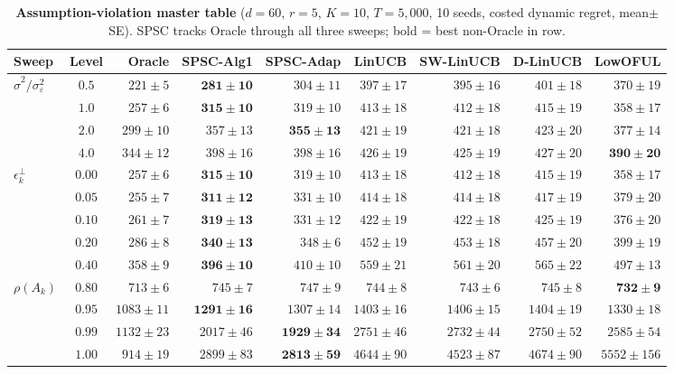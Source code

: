 \documentclass{article}
\begin{document}
\begin{table}[!htbp]
\centering
\caption{\textbf{Assumption-violation master table} ($d{=}60$,
$r{=}5$, $K{=}10$, $T{=}5{,}000$, 10 seeds, costed dynamic regret,
mean$\pm$SE). SPSC tracks Oracle through all three sweeps; bold =
best non-Oracle in row.}
\label{tab:assumption_master}
\footnotesize
\setlength{\tabcolsep}{4pt}
\begin{tabular}{lcrrrrrrr}
\toprule
Sweep & Level & Oracle & SPSC-Alg1 & SPSC-Adap & LinUCB & SW-LinUCB & D-LinUCB & LowOFUL \\
\midrule
\multirow{4}{*}{$\hat\sigma^2/\sigma_\varepsilon^2$}
 & $0.5$ & $221\pm5$  & $\mathbf{281\pm10}$ & $304\pm11$ & $397\pm17$ & $395\pm16$ & $401\pm18$ & $370\pm19$ \\
 & $1.0$ & $257\pm6$  & $\mathbf{315\pm10}$ & $319\pm10$ & $413\pm18$ & $412\pm18$ & $415\pm19$ & $358\pm17$ \\
 & $2.0$ & $299\pm10$ & $357\pm13$ & $\mathbf{355\pm13}$ & $421\pm19$ & $421\pm18$ & $423\pm20$ & $377\pm14$ \\
 & $4.0$ & $344\pm12$ & $398\pm16$ & $398\pm16$ & $426\pm19$ & $425\pm19$ & $427\pm20$ & $\mathbf{390\pm20}$ \\
\midrule
\multirow{5}{*}{$\epsilon_k^\perp$}
 & $0.00$ & $257\pm6$ & $\mathbf{315\pm10}$ & $319\pm10$ & $413\pm18$ & $412\pm18$ & $415\pm19$ & $358\pm17$ \\
 & $0.05$ & $255\pm7$ & $\mathbf{311\pm12}$ & $331\pm10$ & $414\pm18$ & $414\pm18$ & $417\pm19$ & $379\pm20$ \\
 & $0.10$ & $261\pm7$ & $\mathbf{319\pm13}$ & $331\pm12$ & $422\pm19$ & $422\pm18$ & $425\pm19$ & $376\pm20$ \\
 & $0.20$ & $286\pm8$ & $\mathbf{340\pm13}$ & $348\pm6$  & $452\pm19$ & $453\pm18$ & $457\pm20$ & $399\pm19$ \\
 & $0.40$ & $358\pm9$ & $\mathbf{396\pm10}$ & $410\pm10$ & $559\pm21$ & $561\pm20$ & $565\pm22$ & $497\pm13$ \\
\midrule
\multirow{4}{*}{$\rho(A_k)$}
 & $0.80$ & $713\pm6$   & $745\pm7$    & $747\pm9$    & $744\pm8$   & $743\pm6$   & $745\pm8$   & $\mathbf{732\pm9}$ \\
 & $0.95$ & $1083\pm11$ & $\mathbf{1291\pm16}$ & $1307\pm14$  & $1403\pm16$ & $1406\pm15$ & $1404\pm19$ & $1330\pm18$ \\
 & $0.99$ & $1132\pm23$ & $2017\pm46$  & $\mathbf{1929\pm34}$ & $2751\pm46$ & $2732\pm44$ & $2750\pm52$ & $2585\pm54$ \\
 & $1.00$ & $914\pm19$  & $2899\pm83$  & $\mathbf{2813\pm59}$ & $4644\pm90$ & $4523\pm87$ & $4674\pm90$ & $5552\pm156$ \\
\bottomrule
\end{tabular}
\end{table}
\end{document}
